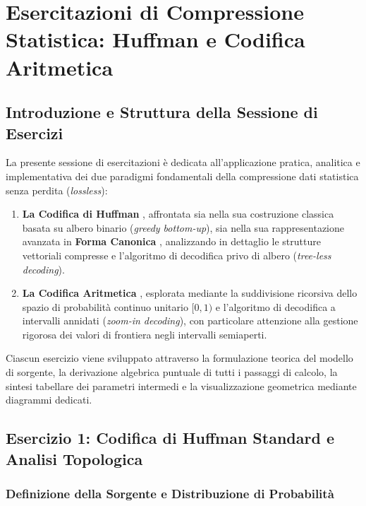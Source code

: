 \chapter{Esercitazioni di Compressione Statistica: Huffman e Codifica Aritmetica}
\label{ch:esercitazioni-compressione-statistica}

\section{Introduzione e Struttura della Sessione di Esercizi}
\label{sec:intro-esercitazioni}

La presente sessione di esercitazioni \`e dedicata all'applicazione pratica, analitica e implementativa dei due paradigmi fondamentali della compressione dati statistica senza perdita (\textit{lossless}):
\begin{enumerate}
  \item \textbf{La Codifica di Huffman} \cite{huffman1952}, affrontata sia nella sua costruzione classica basata su albero binario (\textit{greedy bottom-up}), sia nella sua rappresentazione avanzata in \textbf{Forma Canonica} \cite{hirschberg1990, moffat1997}, analizzando in dettaglio le strutture vettoriali compresse e l'algoritmo di decodifica privo di albero (\textit{tree-less decoding}).
  \item \textbf{La Codifica Aritmetica} \cite{rissanen1976, witten1987}, esplorata mediante la suddivisione ricorsiva dello spazio di probabilit\`a continuo unitario $[0, 1)$ e l'algoritmo di decodifica a intervalli annidati (\textit{zoom-in decoding}), con particolare attenzione alla gestione rigorosa dei valori di frontiera negli intervalli semiaperti.
\end{enumerate}

Ciascun esercizio viene sviluppato attraverso la formulazione teorica del modello di sorgente, la derivazione algebrica puntuale di tutti i passaggi di calcolo, la sintesi tabellare dei parametri intermedi e la visualizzazione geometrica mediante diagrammi dedicati.

\FloatBarrier
\section{Esercizio 1: Codifica di Huffman Standard e Analisi Topologica}
\label{sec:esercizio-huffman-standard}

\subsection{Definizione della Sorgente e Distribuzione di Probabilit\`a}
\label{subsec:ex-modello-sorgente-huffman}

